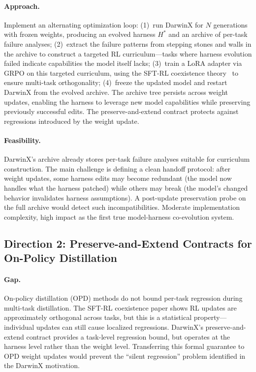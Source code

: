 \documentclass[11pt,a4paper]{article}
\begin{document}
\paragraph{Approach.} Implement an alternating optimization loop: (1)~run DarwinX for $N$ generations with frozen weights, producing an evolved harness $H^*$ and an archive of per-task failure analyses; (2)~extract the failure patterns from stepping stones and walls in the archive to construct a targeted RL curriculum---tasks where harness evolution failed indicate capabilities the model itself lacks; (3)~train a LoRA adapter via GRPO on this targeted curriculum, using the SFT-RL coexistence theory~\cite{zhu2026sft} to ensure multi-task orthogonality; (4)~freeze the updated model and restart DarwinX from the evolved archive. The archive tree persists across weight updates, enabling the harness to leverage new model capabilities while preserving previously successful edits. The preserve-and-extend contract protects against regressions introduced by the weight update.

\paragraph{Feasibility.} DarwinX's archive already stores per-task failure analyses suitable for curriculum construction. The main challenge is defining a clean handoff protocol: after weight updates, some harness edits may become redundant (the model now handles what the harness patched) while others may break (the model's changed behavior invalidates harness assumptions). A post-update preservation probe on the full archive would detect such incompatibilities. Moderate implementation complexity, high impact as the first true model-harness co-evolution system.

\subsection{Direction 2: Preserve-and-Extend Contracts for On-Policy Distillation}

\paragraph{Gap.} On-policy distillation (OPD) methods do not bound per-task regression during multi-task distillation. The SFT-RL coexistence paper shows RL updates are approximately orthogonal across tasks, but this is a statistical property---individual updates can still cause localized regressions. DarwinX's preserve-and-extend contract provides a task-level regression bound, but operates at the harness level rather than the weight level. Transferring this formal guarantee to OPD weight updates would prevent the ``silent regression'' problem identified in the DarwinX motivation.
\end{document}

